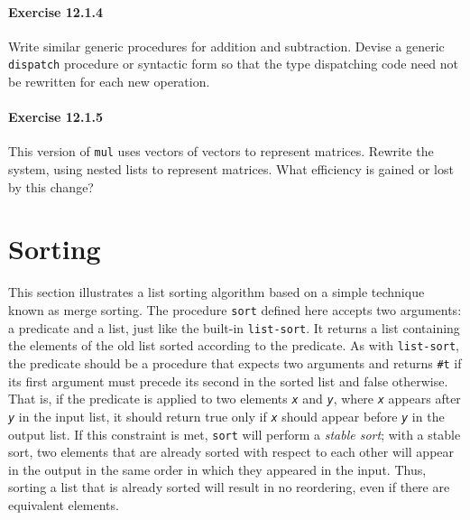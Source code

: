 \paragraph{Exercise \label{examples_g156}12.1.4}


\label{examples_s7}Write similar generic procedures for addition and subtraction.
Devise a generic \texttt{dispatch} procedure or syntactic form so that the type
dispatching code need not be rewritten for each new operation.


\paragraph{Exercise \label{examples_g157}12.1.5}


\label{examples_s8}This version of \texttt{mul} uses vectors
of vectors to represent matrices.
Rewrite the system, using nested lists to represent matrices.
What efficiency is gained or lost by this change?



\section{\label{examples_g158}\label{examples_h2}Sorting\label{examples_SECTEXSORTMERGE}}



\label{examples_s9}This section illustrates a list sorting algorithm based on a simple
technique known as merge sorting.
The procedure \label{examples_s10}\texttt{sort} defined here
accepts two arguments: a predicate and a list, just like the built-in
\texttt{list-sort}.
It returns a list containing the elements of the old list sorted
according to the predicate.
As with \texttt{list-sort},
the predicate should be a procedure that expects two arguments and
returns \texttt{\#{}t} if its first argument must precede its
second in the sorted list and false otherwise.
That is, if the predicate is applied to two elements \texttt{\textit{x}} and
\texttt{\textit{y}}, where \texttt{\textit{x}} appears after \texttt{\textit{y}} in the input
list, it should return true only if \texttt{\textit{x}} should appear before
\texttt{\textit{y}} in the output list.
If this constraint is met, \texttt{sort} will perform a \textit{stable sort};
with a stable sort, two elements that are already sorted with respect
to each other will appear in the output in the same order in which
they appeared in the input.
Thus, sorting a list that is already sorted will result in no
reordering, even if there are equivalent elements.


